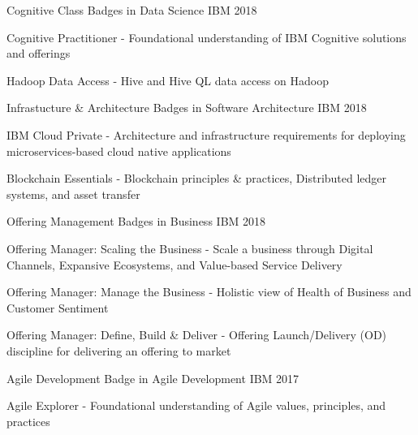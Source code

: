 \begin{cventries}
  \cventry
    {Cognitive Class} %
    {Badges in Data Science} %
    {IBM} %
    {2018} %
    {
      \begin{cvitems} %
        \item {Cognitive Practitioner - Foundational understanding of IBM Cognitive solutions and offerings}
        \item {Hadoop Data Access - Hive and Hive QL data access on Hadoop}
      \end{cvitems}
    }

  \cventry
    {Infrastucture \& Architecture} %
    {Badges in Software Architecture} %
    {IBM} %
    {2018} %
    {
      \begin{cvitems} %
        \item {IBM Cloud Private - Architecture and infrastructure requirements for deploying microservices-based cloud native applications}
        \item {Blockchain Essentials - Blockchain principles \& practices, Distributed ledger systems, and asset transfer}
      \end{cvitems}
    }

  \cventry
    {Offering Management} %
    {Badges in Business} %
    {IBM} %
    {2018} %
    {
      \begin{cvitems} %
        \item {Offering Manager: Scaling the Business - Scale a business through Digital Channels, Expansive Ecosystems, and Value-based Service Delivery}
        \item {Offering Manager: Manage the Business - Holistic view of Health of Business and Customer Sentiment}
        \item {Offering Manager: Define, Build \& Deliver - Offering Launch/Delivery (OD) discipline for delivering an offering to market}
      \end{cvitems}
    }

  \cventry
    {Agile Development} %
    {Badge in Agile Development} %
    {IBM} %
    {2017} %
    {
      \begin{cvitems} %
        \item {Agile Explorer - Foundational understanding of Agile values, principles, and practices}
      \end{cvitems}
    }

\end{cventries}
